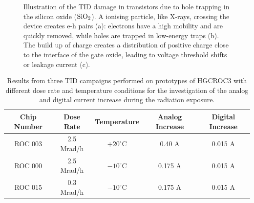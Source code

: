 \begin{figure}
    \centering
    \hspace{0.1cm}
    \hspace{0.1cm}
    \caption{Illustration of the TID damage in transistors due to hole trapping in the silicon oxide ($\textnormal{SiO}_2$). A ionising particle, like X-rays, crossing the device creates e-h pairs (a): electrons have a high mobility and are quickly removed, while holes are trapped in low-energy traps (b). The build up of charge creates a distribution of positive charge close to the interface of the gate oxide, leading to voltage threshold shifts or leakage current (c).}
    \label{fig:TID_Transistors}
\end{figure}

\begin{table}
    \centering
    \begin{tabular}{c|c|c|c|c}
        \hline
        \hline
        Chip Number & Dose Rate & Temperature & Analog Increase & Digital Increase \\
        \hline
        ROC 003 & 2.5 Mrad/h & $+20^{\circ}$C & 0.40 A & 0.015 A \\
        ROC 000 & 2.5 Mrad/h & $-10^{\circ}$C & 0.175 A & 0.015 A \\
        ROC 015 & 0.3 Mrad/h & $-10^{\circ}$C & 0.175 A & 0.015 A \\
        \hline
        \hline
    \end{tabular}
    \caption{Results from three TID campaigns performed on prototypes of HGCROC3 with different dose rate and temperature conditions for the investigation of the analog and digital current increase during the radiation exposure.}
    \label{tab:TID_Current}
\end{table}

